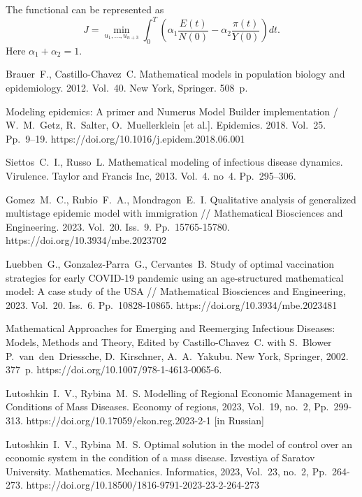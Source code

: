 \documentclass[12pt]{llncs}
\begin{document}
The functional can be represented as
$$J=\min_{u_1,...,u_{n+3}}\int_{0}^{T}\left(\alpha_1\frac{E(t)}{N(0)}-\alpha_2\frac{\pi(t)}{Y(0)}\right)dt.$$
Here $\alpha_1+\alpha_2=1$.


\begin{thebibliography}{9} %

 Brauer~F., Castillo-Chavez~C. Mathematical models in population biology and epidemiology. 2012. Vol.~40. New York, Springer. 508~p.

 Modeling epidemics: A primer and Numerus Model Builder implementation / W.~M.~Getz, R.~Salter, O.~Muellerklein [et al.].  Epidemics. 2018.  Vol.~25.  Pp.~9–19. https://doi.org/10.1016/j.epidem.2018.06.001

 Siettos~C.~I., Russo~L. Mathematical modeling of infectious disease dynamics. Virulence. Taylor and Francis Inc, 2013.  Vol.~4. no~4. Pp.~295–306.

 Gomez~M.~C., Rubio~F.~A., Mondragon~E.~I. Qualitative analysis of generalized multistage epidemic model with immigration // Mathematical Biosciences and Engineering. 2023. Vol.~20. Iss.~9. Pp.~15765-15780.  https://doi.org/10.3934/mbe.2023702

 Luebben~G., Gonzalez-Parra~G.,  Cervantes~B. Study of optimal vaccination strategies for early COVID-19 pandemic using an age-structured mathematical model:  A case study of the USA // Mathematical Biosciences and Engineering, 2023. Vol.~20. Iss.~6. Pp.~10828-10865.  https://doi.org/10.3934/mbe.2023481

 Mathematical Approaches for Emerging and Reemerging Infectious Diseases: Models, Methods and Theory, Edited by Castillo-Chavez~C. with S.~Blower P.~van~den~Driessche, D.~Kirschner, A.~A.~Yakubu. New York, Springer, 2002. 377~p. https://doi.org/10.1007/978-1-4613-0065-6.

 Lutoshkin~I.~V., Rybina~M.~S. Modelling of Regional Economic Management in Conditions of Mass Diseases.  Economy of regions, 2023, Vol.~19, no.~2, Pp.~299-313. https://doi.org/10.17059/ekon.reg.2023-2-1 [in Russian]

 Lutoshkin~I.~V., Rybina~M.~S. Optimal solution in the model of control over an economic system in the condition of a mass disease. Izvestiya of Saratov University.  Mathematics. Mechanics. Informatics, 2023, Vol.~23, no.~2, Pp.~264-273. https://doi.org/10.18500/1816-9791-2023-23-2-264-273

\end{thebibliography}
\end{document}
